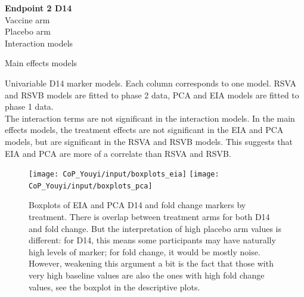 \documentclass[11pt]{article}
\begin{document}
\begin{table}[H]
\tiny{
    \textbf{Endpoint 2 D14}\\
    
    Vaccine arm\\
    
    
    \vspace{5pt}
    Placebo arm\\
    

    \vspace{5pt}
    Interaction models\\
    \setlength{\tabcolsep}{.5ex}

    \vspace{5pt}
    Main effects models\\
    \setlength{\tabcolsep}{.5ex}
    
}
    \caption{Univariable D14 marker models. Each column corresponds to one model. RSVA and RSVB models are fitted to phase 2 data, PCA and EIA models are fitted to phase 1 data. \\
    The interaction terms are not significant in the interaction models. In the main effects models, the treatment effects are not significant in the EIA and PCA models, but are significant in the RSVA and RSVB models. This suggests that EIA and PCA are more of a correlate than RSVA and RSVB.  
}
    \label{tab:y2_log10d14_prentice}
\end{table}

\begin{figure}[H]
    \centering
    \texttt{[image: CoP\_Youyi/input/boxplots\_eia]}
    \texttt{[image: CoP\_Youyi/input/boxplots\_pca]}
    \caption{Boxplots of EIA and PCA D14 and fold change markers by treatment. There is overlap between treatment arms for both D14 and fold change. But the interpretation of high placebo arm values is different: for D14, this means some participants may have naturally high levels of marker; for fold change, it would be mostly noise. However, weakening this argument a bit is the fact that those with very high baseline values are also the ones with high fold change values, see the boxplot in the descriptive plots.}
    \label{fig:boxplots_eia}
\end{figure}

\clearpage
\end{document}
